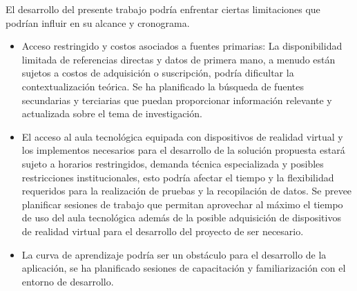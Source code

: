 
El desarrollo del presente trabajo podría enfrentar ciertas limitaciones que podrían influir en su alcance y cronograma.

\begin{itemize}
  \item Acceso restringido y costos asociados a fuentes primarias: La disponibilidad limitada de referencias directas y datos de primera mano, a menudo están sujetos a costos de adquisición o suscripción, podría dificultar la contextualización teórica. Se ha planificado la búsqueda de fuentes secundarias y terciarias que puedan proporcionar información relevante y actualizada sobre el tema de investigación.
  \item El acceso al aula tecnológica equipada con dispositivos de realidad virtual y los implementos necesarios para el desarrollo de la solución propuesta estará sujeto a horarios restringidos, demanda técnica especializada y posibles restricciones institucionales, esto podría afectar el tiempo y la flexibilidad requeridos para la realización de pruebas y la recopilación de datos. Se prevee planificar sesiones de trabajo que permitan aprovechar al máximo el tiempo de uso del aula tecnológica además de la posible adquisición de dispositivos de realidad virtual para el desarrollo del proyecto de ser necesario.
  \item La curva de aprendizaje podría ser un obstáculo para el desarrollo de la aplicación, se ha planificado sesiones de capacitación y familiarización con el entorno de desarrollo.
\end{itemize}
